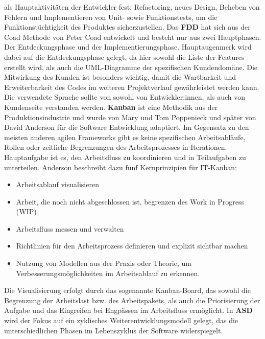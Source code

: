 als Hauptaktivitäten der Entwickler fest: Refactoring, neues Design, Beheben von Fehlern und Implementieren von Unit- 
sowie Funktionstests, um die Funktionstüchtigkeit des Produktes sicherzustellen. \cite{Alshayeb2006-nt}
\newline
Das \textbf{FDD} hat sich aus der Coad Methode von Peter Coad entwickelt und besteht nur aus zwei Hauptphasen. 
Der Entdeckungsphase und der Implementierungsphase. Hauptaugenmerk wird dabei auf die Entdeckungsphase gelegt, da hier sowohl die Liste der Features erstellt wird, als auch die UML-Diagramme der spezifischen Kundendomäne. 
Die Mitwirkung des Kunden ist besonders wichtig, damit die Wartbarkeit und Erweiterbarkeit des Codes im weiteren Projektverlauf gewährleistet werden kann. 
Die verwendete Sprache sollte von sowohl von Entwickler:innen, als auch von Kundenseite verstanden werden. \cite{Chowdhury2011-hg}
\newline
\textbf{Kanban} ist eine Methodik aus der Produktionsindustrie und wurde von Mary und Tom Poppenieck und später von David Anderson für 
die Software Entwicklung adaptiert. Im Gegensatz zu den meisten anderen agilen Frameworks gibt es keine spezifischen Arbeitsabläufe, 
Rollen oder zeitliche Begrenzungen des Arbeitsprozesses in Iterationen. 
Hauptaufgabe ist es, den Arbeitsfluss zu koordinieren und in Teilaufgaben zu unterteilen. Anderson beschreibt dazu fünf Kernprinzipien für IT-Kanban:
\begin{itemize}
    \item Arbeitsablauf visualisieren
    \item Arbeit, die noch nicht abgeschlossen ist, begrenzen des Work in Progress (WIP) 
    \item Arbeitsfluss messen und verwalten
    \item Richtlinien für den Arbeitsprozess definieren und explizit sichtbar machen
    \item Nutzung von Modellen aus der Praxis oder Theorie, um Verbesserungsmöglichkeiten im Arbeitsablauf zu erkennen.
\end{itemize}
Die Visualisierung erfolgt durch das sogenannte Kanban-Board, das sowohl die Begrenzung der Arbeitslast bzw. des Arbeitspakets, 
als auch die Priorisierung der Aufgabe und das Eingreifen bei Engpässen im Arbeitsfluss ermöglicht. \cite{Ahmad2018-jv,Granulo2019-wm}
\newline
In \textbf{ASD} wird der Fokus auf ein zyklisches Weiterentwicklungsmodell gelegt, das die unterschiedlichen Phasen im Lebenszyklus
der Software widerspiegelt. \cite{Abdelaziz2015-lb}
